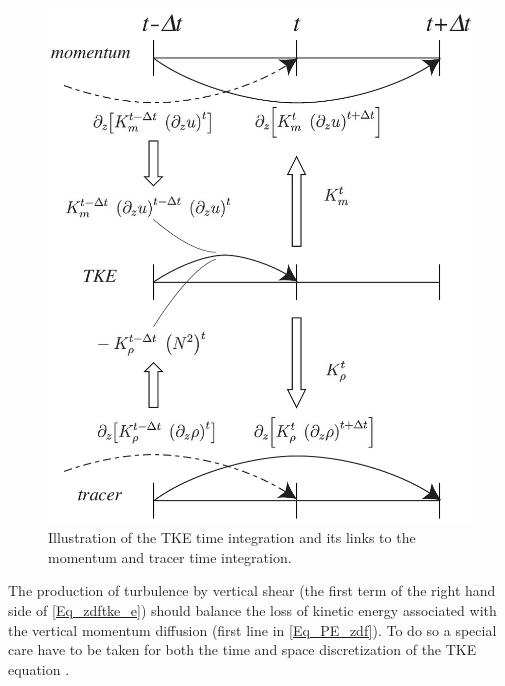\begin{figure}[!t]   \begin{center}
\includegraphics[width=1.00\textwidth]{./TexFiles/Figures/Fig_ZDF_TKE_time_scheme.pdf}
\caption{ \label{Fig_TKE_time_scheme} 
Illustration of the TKE time integration and its links to the momentum and tracer time integration. }
\end{center}  
\end{figure}

The production of turbulence by vertical shear (the first term of the right hand side 
of \eqref{Eq_zdftke_e}) should balance the loss of kinetic energy associated with
the vertical momentum diffusion (first line in \eqref{Eq_PE_zdf}). To do so a special care 
have to be taken for both the time and space discretization of the TKE equation 
\citep{Burchard_OM02,Marsaleix_al_OM08}.

